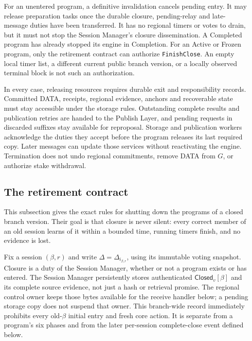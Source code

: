 \documentclass[11pt,a4paper]{article}
\newcommand{\tagg}[1]{\ensuremath{\mathsf{#1}}}
\begin{document}
For an unentered program, a definitive invalidation cancels pending entry.
It may release preparation tasks once the durable closure, pending-relay
and late-message duties have been transferred. It has no regional timers
or votes to drain, but it must not stop the Session Manager's closure
dissemination. A Completed program has already stopped its engine in
Completion. For an Active or Frozen program, only the retirement contract
can authorize \texttt{FinishClose}. An empty local timer list, a
different current public branch version, or a locally observed terminal
block is not such an authorization.

In every case, releasing resources requires durable exit and
responsibility records. Committed DATA, receipts, regional evidence,
anchors and recoverable state must stay accessible under the storage
rules. Outstanding complete results and publication retries are handed
to the Publish Layer, and pending requests in discarded suffixes stay
available for reproposal. Storage and publication workers acknowledge
the duties they accept before the program releases its last required
copy. Later messages can update those services without reactivating the
engine. Termination does not undo regional commitments, remove DATA from
$G$, or authorize stake withdrawal.

\subsection{The retirement contract}
\label{sec:retirement}
This subsection gives the exact rules for shutting down the programs of a closed branch version. Their goal is that closure is never silent: every correct member of an old session learns of it within a bounded time, running timers finish, and no evidence is lost.

Fix a session $(\beta,r)$ and write $\Delta=\Delta_{i_{\beta,r}}$,
using its immutable voting snapshot. Closure is a duty of the Session Manager,
whether or not a program exists or has entered.
The Session Manager persistently stores authenticated $\tagg{Closed}_v[\beta]$
and its complete source evidence, not just a hash or retrieval promise.
The regional control owner keeps those bytes available for the receive
handler below; a pending storage copy does not suspend that owner.
This branch-wide record immediately
prohibits every old-$\beta$ initial entry and fresh core action.
It is separate from a program's six phases and from the later
per-session complete-close event defined below.
\end{document}
